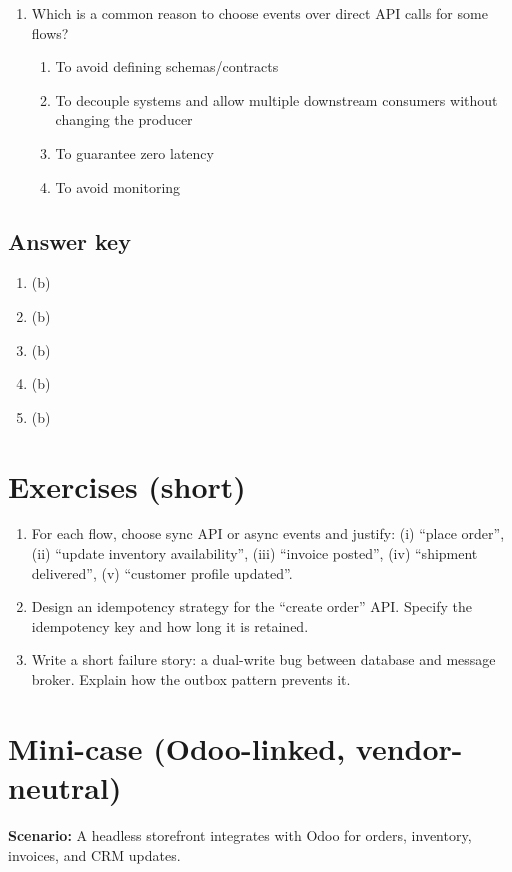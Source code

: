 \begin{enumerate}
  \item Which is a common reason to choose events over direct API calls for some flows?
  \begin{enumerate}
    \item To avoid defining schemas/contracts
    \item To decouple systems and allow multiple downstream consumers without changing the producer
    \item To guarantee zero latency
    \item To avoid monitoring
  \end{enumerate}
\end{enumerate}

\subsection*{Answer key}
\begin{enumerate}
  \item (b)
  \item (b)
  \item (b)
  \item (b)
  \item (b)
\end{enumerate}

\section{Exercises (short)}
\begin{enumerate}
  \item For each flow, choose sync API or async events and justify: (i) ``place order'', (ii) ``update inventory availability'', (iii) ``invoice posted'', (iv) ``shipment delivered'', (v) ``customer profile updated''.
  \item Design an idempotency strategy for the ``create order'' API. Specify the idempotency key and how long it is retained.
  \item Write a short failure story: a dual-write bug between database and message broker. Explain how the outbox pattern prevents it.
\end{enumerate}

\section{Mini-case (Odoo-linked, vendor-neutral)}
\textbf{Scenario:} A headless storefront integrates with Odoo for orders, inventory, invoices, and CRM updates.

